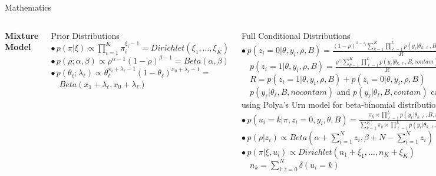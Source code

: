 \documentclass[letter,graphicx]{beamer}
\begin{document}
\begin{frame}{Mathematics}
\begin{tiny}
\begin{columns}[T]
\column{2.5in}
\centerline{\textbf{Mixture Model}}
\vspace{2mm}
Prior Distributions \\ \vspace{1mm}
$\bullet \, p(\pi|\xi) \propto \prod_{i = 1}^K \pi_{i}^{\xi_i - 1} = Dirichlet(\xi_1, \ldots, \xi_K)$ \\
\vspace{1mm}
$\bullet \, p(\rho;\alpha,\beta) \propto \rho^{\alpha - 1}(1 - \rho)^{\beta - 1} = Beta(\alpha, \beta)$
$\bullet \, p(\theta_{\ell};\lambda_{\ell}) \propto \theta_{\ell}^{x_i + \lambda_{\ell}-1}(1 - \theta_{\ell})^{x_0 + \lambda_{\ell}-1} = $ \\ 
\vspace{1mm}
$\quad Beta(x_1 + \lambda_{\ell},x_0 + \lambda_{\ell})$ \\ 
\vspace{2mm}

Full Conditional Distributions \\ \vspace{1mm}
$\bullet \, p(z_i=0|\theta,y_i,\rho,B) = \frac{(1-\rho)^{1-z_i}\sum_{k=1}^{K} \prod_{\ell=1}^{L} p(y_{\ell}|\theta_{k,\ell},B,nocontam)}{R}$ \\ 
\vspace{1mm}
$\quad p(z_i=1|\theta,y_i,\rho,B) = \frac{\rho^{z_i}\sum_{k=1}^{K} \prod_{\ell=1}^{L} p(y_{\ell}|\theta_{k,\ell},B,contam)}{R}$ \\
 \vspace{1mm}
$\quad R = p(z_i=1|\theta,y_i,\rho,B) + p(z_i = 0|\theta,y_i,\rho,B)$ \\ 
\vspace{1mm}
$\quad p(y_{\ell} |\theta_{\ell},B,nocontam)$ and $p(y_{\ell} |\theta_{\ell},B,contam)$ calculated \\
\vspace{1mm}
\quad using Polya's Urn model for beta-binomial distribution \\
\vspace{1mm}
$\bullet \, p(u_i = k|\pi,z_i=0,y_i,\theta,B) = \frac{\pi_k \times \prod_{\ell=1}^{L} p(y_{\ell}|\theta_{k,\ell},B,nocontam)}{\sum_{k=1}^{K} \pi_k \times \prod_{\ell=1}^{L} p(y_{\ell}|\theta_{k,\ell},B,nocontam)}$ \\
\vspace{1mm}
$\bullet \, p(\rho|z_i) \propto Beta(\alpha + \sum_{i=1}^{N} z_i, \beta + N - \sum_{i=1}^{N} z_i)$ \\ \vspace{1mm}
$\bullet \, p(\pi|\xi,u_i) \propto Dirichlet(n_1 + \xi_1, \ldots, n_K + \xi_K)$ \\
\vspace{1mm}
$\quad n_k = \sum_{i:z=0}^{N} \delta(u_{i} = k)$
\end{columns}
\end{tiny}
\end{frame} 
\end{document}

